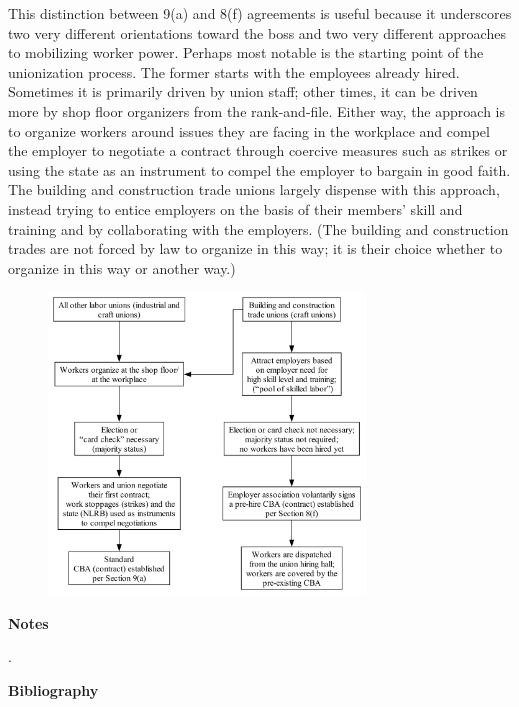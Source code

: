 This distinction between 9(a) and 8(f) agreements is useful because it underscores two very different orientations toward the boss and two very different approaches to mobilizing worker power. Perhaps most notable is the starting point of the unionization process. The former starts with the employees already hired. Sometimes it is primarily driven by union staff; other times, it can be driven more by shop floor organizers from the rank-and-file. Either way, the approach is to organize workers around issues they are facing in the workplace and compel the employer to negotiate a contract through coercive measures such as strikes or using the state as an instrument to compel the employer to bargain in good faith. The building and construction trade unions largely dispense with this approach, instead trying to entice employers on the basis of their members’ skill and training and by collaborating with the employers. (The building and construction trades are not forced by law to organize in this way; it is their choice whether to organize in this way or another way.)

\begin{figure}
  \centering
  \includegraphics[width=0.75\textwidth]{images/organizing_paths}
  \caption{}
  \label{fig:organizing_paths}
\end{figure}


\newpage
\begin{center}
{\bfseries Notes}
\end{center}

\noindent
.
\newpage
\begin{center}
{\bfseries Bibliography}
\end{center}




